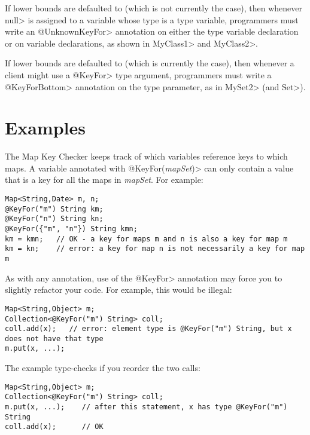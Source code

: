 \medskip


If lower bounds are defaulted to  (which is not
currently the case), then whenever \<null> is assigned to a variable whose
type is a type variable, programmers must write an \<@UnknownKeyFor>
annotation on either the type variable declaration or on variable
declarations, as shown in \<MyClass1> and
\<MyClass2>.

If lower bounds are defaulted to  (which is currently
the case), then whenever a client might use a \<@KeyFor> type argument,
programmers must write a \<@KeyForBottom> annotation on the type parameter,
as in \<MySet2> (and \<Set>).



\section{Examples\label{map-key-examples}}

The Map Key Checker keeps track of which variables reference keys to
which maps.  A variable annotated with \<@KeyFor(\emph{mapSet})> can only
contain a value that is a key for all the maps in \emph{mapSet}.  For example:

\begin{verbatim}
Map<String,Date> m, n;
@KeyFor("m") String km;
@KeyFor("n") String kn;
@KeyFor({"m", "n"}) String kmn;
km = kmn;   // OK - a key for maps m and n is also a key for map m
km = kn;    // error: a key for map n is not necessarily a key for map m
\end{verbatim}


As with any annotation, use of the \<@KeyFor> annotation may force you to
slightly refactor your code.  For example, this would be illegal:

\begin{verbatim}
Map<String,Object> m;
Collection<@KeyFor("m") String> coll;
coll.add(x);   // error: element type is @KeyFor("m") String, but x does not have that type
m.put(x, ...);
\end{verbatim}

\noindent
The example type-checks if you reorder the two calls:

\begin{verbatim}
Map<String,Object> m;
Collection<@KeyFor("m") String> coll;
m.put(x, ...);    // after this statement, x has type @KeyFor("m") String
coll.add(x);      // OK
\end{verbatim}



